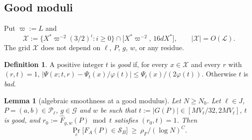 \documentclass[11pt]{amsart}
\newtheorem{lemma}[theorem]{Lemma}
\theoremstyle{definition}
\newtheorem{definition}[theorem]{Definition}
\newcommand{\cG}{\mathcal{G}}
\newcommand{\cL}{\mathcal{L}}
\newcommand{\cP}{\mathcal{P}}
\newcommand{\cS}{\mathcal{S}}
\newcommand{\cX}{\mathcal{X}}
\newcommand{\XF}{X^{*}}
\newcommand{\rF}{\rho_F}
\newcommand{\Prob}{\Pr}
\begin{document}
\subsection{Good moduli}
Put $\varpi:=L$ and
\[
\cX:=\bigl\{\XF\varpi^{-2}(3/2)^i:i\ge0\bigr\}\cap\bigl[\XF\varpi^{-2},\,16d\XF\bigr],\qquad|\cX|=O(\cL).
\]
The grid $\cX$ does not depend on $\ell$, $P$, $g$, $w$, or any residue.

\begin{definition}\label{def:good}
A positive integer $t$ is \emph{good} if, for every $x\in\cX$ and every $r$ with $(r,t)=1$,
$|\Psi(x;t,r)-\Psi_t(x)/\varphi(t)|\le\Psi_t(x)/(2\varphi(t))$. Otherwise $t$ is \emph{bad}.
\end{definition}

\begin{lemma}[algebraic smoothness at a good modulus]\label{lem:goodmod}
Let $N\ge N_0$. Let $\ell\in J$, $P=(a,b)\in\cP_\ell$, $g\in\cG$ and $w$ be such that $t:=|G(P)|\in[MV_\ell/32,2MV_\ell]$, $t$ is good,
and $r_0:=\hat F_{g,w}(P)\bmod t$ satisfies $(r_0,t)=1$. Then
\[
\Prob_c\bigl[F_A(P)\in\cS_B\bigr]\ \ge\ \rF/(\log N)^{C}.
\]
\end{lemma}
\end{document}
